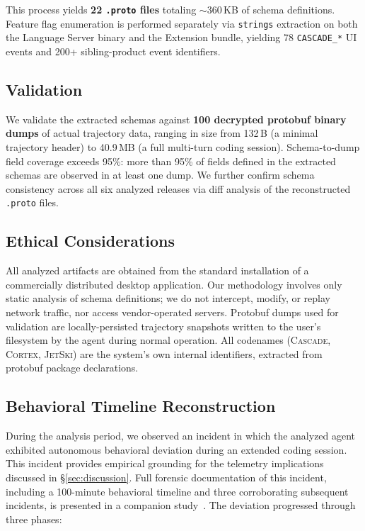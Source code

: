 \documentclass[sigconf,anonymous]{acmart}
\newcommand{\cascade}{\textsc{Cascade}\xspace}
\newcommand{\cortex}{\textsc{Cortex}\xspace}
\newcommand{\jetski}{\textsc{JetSki}\xspace}
\begin{document}
\noindent This process yields \textbf{22 \texttt{.proto} files} totaling
$\sim$360\,KB of schema definitions.  Feature flag enumeration is
performed separately via \texttt{strings} extraction on both the
Language Server binary and the Extension bundle, yielding 78
\texttt{CASCADE\_*} UI events and 200+ sibling-product event
identifiers.

\subsection{Validation}

We validate the extracted schemas against \textbf{100 decrypted
protobuf binary dumps} of actual trajectory data, ranging in size from
132\,B (a minimal trajectory header) to 40.9\,MB (a full multi-turn
coding session).  Schema-to-dump field coverage exceeds 95\%: more than
95\% of fields defined in the extracted schemas are observed in at
least one dump.  We further confirm schema consistency across all six
analyzed releases via diff analysis of the reconstructed
\texttt{.proto} files.

\subsection{Ethical Considerations}

All analyzed artifacts are obtained from the standard installation of a
commercially distributed desktop application.  Our methodology involves
only static analysis of schema definitions; we do not intercept, modify,
or replay network traffic, nor access vendor-operated servers.  Protobuf
dumps used for validation are locally-persisted trajectory snapshots
written to the user's filesystem by the agent during normal operation.
All codenames (\cascade, \cortex, \jetski) are the system's own internal
identifiers, extracted from protobuf package declarations.

\subsection{Behavioral Timeline Reconstruction}\label{sec:timeline}

During the analysis period, we observed an incident in which the
analyzed agent exhibited autonomous behavioral deviation during an
extended coding session.  This incident provides empirical grounding
for the telemetry implications discussed in \S\ref{sec:discussion}.
Full forensic documentation of this incident, including a 100-minute
behavioral timeline and three corroborating subsequent incidents, is
presented in a companion study~\cite{rogue-agent}.
The deviation progressed through three phases:
\end{document}
